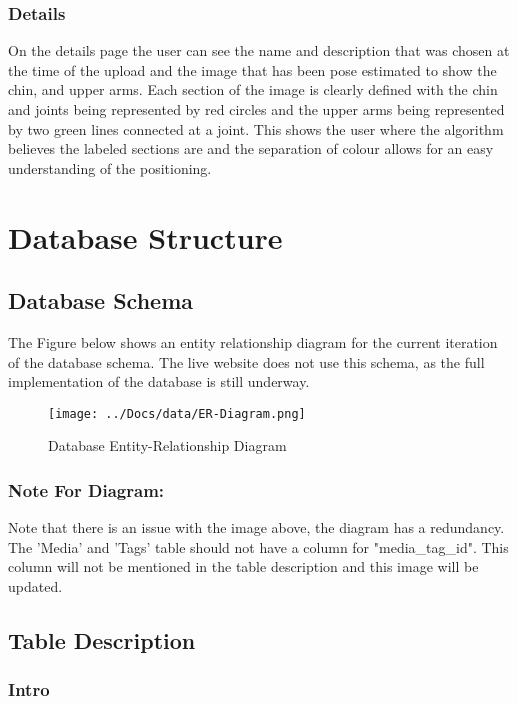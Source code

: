 \documentclass{scrreprt}
\begin{document}
\subsection{Details}
On the details page the user can see the name and description that was chosen at the time of the upload and the image that has been pose estimated to show the chin, and upper arms. Each section of the image is clearly defined with the chin and joints being represented by red circles and the upper arms being represented by two green lines connected at a joint. This shows the user where the algorithm believes the labeled sections are and the separation of colour allows for an easy understanding of the positioning.

\chapter{Database Structure}

\section{Database Schema}
The Figure below shows an entity relationship diagram for the current iteration of the database schema. The live website does not use this schema, as the full implementation of the database is still underway.

\begin{figure}[!ht]
    \caption{Database Entity-Relationship Diagram}
    \label{erDiagram}
	\centering
	\texttt{[image: ../Docs/data/ER-Diagram.png]}
\end{figure}

\subsection{Note For Diagram:}

Note that there is an issue with the image above, the diagram has a redundancy.
The 'Media' and 'Tags' table should not have a column for "media\_tag\_id". This column will not be mentioned in the table description and this image will be updated.


\section{Table Description}

\subsection{Intro}
\end{document}
